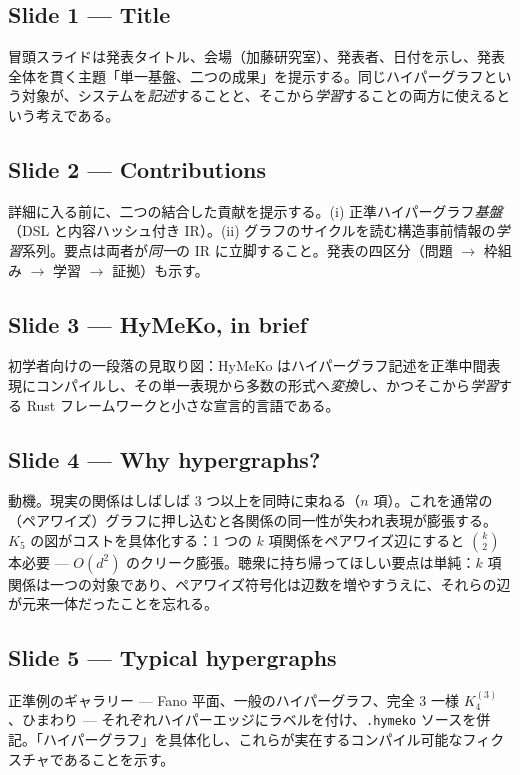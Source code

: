 \documentclass[10pt]{article}
\begin{document}
\subsection*{Slide 1 --- Title}
冒頭スライドは発表タイトル、会場（加藤研究室）、発表者、日付を示し、発表全体を貫く主題「単一基盤、二つの成果」を提示する。同じハイパーグラフという対象が、システムを\emph{記述}することと、そこから\emph{学習}することの両方に使えるという考えである。

\subsection*{Slide 2 --- Contributions}
詳細に入る前に、二つの結合した貢献を提示する。(i) 正準ハイパーグラフ\emph{基盤}（DSL と内容ハッシュ付き IR）。(ii) グラフのサイクルを読む構造事前情報の\emph{学習}系列。要点は両者が\emph{同一}の IR に立脚すること。発表の四区分（問題 $\to$ 枠組み $\to$ 学習 $\to$ 証拠）も示す。

\subsection*{Slide 3 --- HyMeKo, in brief}
初学者向けの一段落の見取り図：HyMeKo はハイパーグラフ記述を正準中間表現にコンパイルし、その単一表現から多数の形式へ\emph{変換}し、かつそこから\emph{学習}する Rust フレームワークと小さな宣言的言語である。

\subsection*{Slide 4 --- Why hypergraphs?}
動機。現実の関係はしばしば 3 つ以上を同時に束ねる（$n$ 項）。これを通常の（ペアワイズ）グラフに押し込むと各関係の同一性が失われ表現が膨張する。$K_5$ の図がコストを具体化する：1 つの $k$ 項関係をペアワイズ辺にすると $\binom{k}{2}$ 本必要 --- $O(d^2)$ のクリーク膨張。聴衆に持ち帰ってほしい要点は単純：$k$ 項関係は一つの対象であり、ペアワイズ符号化は辺数を増やすうえに、それらの辺が元来一体だったことを忘れる。

\subsection*{Slide 5 --- Typical hypergraphs}
正準例のギャラリー --- Fano 平面、一般のハイパーグラフ、完全 3 一様 $K_4^{(3)}$、ひまわり --- それぞれハイパーエッジにラベルを付け、\texttt{.hymeko} ソースを併記。「ハイパーグラフ」を具体化し、これらが実在するコンパイル可能なフィクスチャであることを示す。
\end{document}

